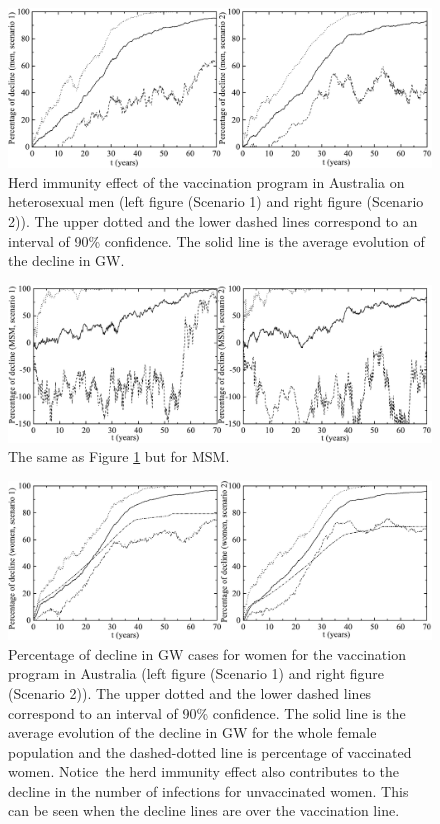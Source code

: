 \begin{figure}[H]
	\centering
	\includegraphics[scale=0.55]{FigHerdImmunity1.pdf}
	\caption{Herd immunity effect of the vaccination program in Australia on heterosexual men (left figure (Scenario 1) and right figure (Scenario 2)). The upper dotted and the lower dashed lines correspond to an interval of 90\% confidence. The solid line
	is the average evolution of the decline in GW.}
	\label{fig5}
\end{figure}
\vspace{-12pt}
\begin{figure}[H]
	\centering
	\includegraphics[scale=0.55]{FigHerdImmunity3.pdf}
	\caption{The same as Figure \protect\ref{fig5} but for MSM.}
	\label{fig7}
\end{figure}
\vspace{-12pt}
\begin{figure}[H]
	\centering
	\includegraphics[scale=0.55]{FigHerdImmunity2.pdf}
	\caption{Percentage of decline in GW cases for women for the vaccination program in Australia (left figure (Scenario 1) and right figure (Scenario 2)). The upper dotted and the lower dashed lines correspond to an interval of 90\% confidence. The solid line
	is the average evolution of the decline in GW for the whole female population and the dashed-dotted line is percentage of vaccinated women. Notice~the herd immunity effect also contributes to the decline in the number of infections for unvaccinated women. This can be seen when the decline lines are over the vaccination line.}
	\label{fig6}
\end{figure}